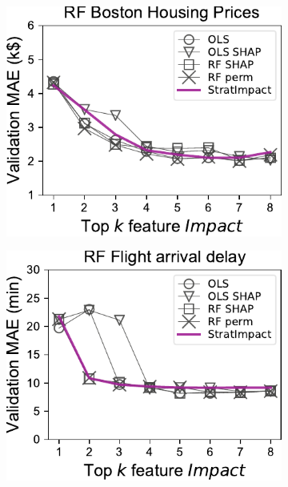 \documentclass[11pt]{article}
\begin{document}
\begin{figure}
\vspace{1mm}
\begin{subfigure}{.245\textwidth}
    \centering
\includegraphics[scale=0.45]{images/boston-topk-RF-Impact.pdf}
\vspace{-7mm}
\subcaption{}
\end{subfigure}%
\hfill
\begin{subfigure}{.25\textwidth}
    \centering
\includegraphics[scale=0.45]{images/flights-topk-RF-Impact.pdf}
\vspace{-2.5mm}
\subcaption{}
\end{subfigure}
\hfill
\begin{subfigure}{.25\textwidth}

\end{subfigure}
\end{figure}
\end{document}
